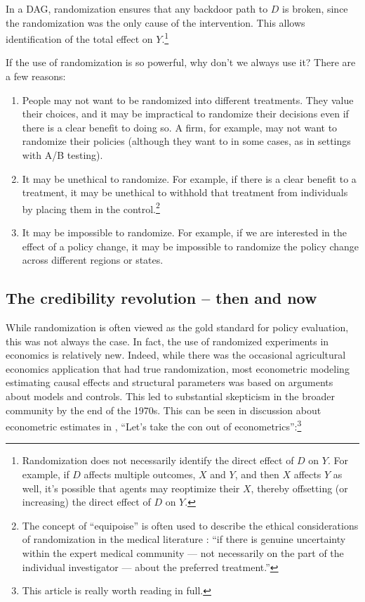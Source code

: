 \documentclass{tufte-handout}
\theoremstyle{break}
\begin{document}
In a DAG, randomization ensures that any backdoor path to $D$ is broken, since the randomization was the only cause of the intervention. This allows identification of the total effect on $Y$.\footnote{Randomization does not necessarily identify the direct effect of $D$ on $Y$. For example, if $D$ affects multiple outcomes, $X$ and $Y$, and then $X$ affects $Y$ as well, it's possible that agents may reoptimize their $X$, thereby offsetting (or increasing) the direct effect of $D$ on $Y$.}

If the use of randomization is so powerful, why don't we always use it? There are a few reasons:

\begin{enumerate}
  \item People may not want to be randomized into different treatments. They value their choices, and it may be impractical to randomize their decisions even if there is a clear benefit to doing so. A firm, for example, may not want to randomize their policies (although they want to in some cases, as in settings with A/B testing).
  \item It may be unethical to randomize. For example, if there is a clear benefit to a treatment, it may be unethical to withhold that treatment from individuals by placing them in the control.\footnote{The concept of ``equipoise'' is often used to describe the ethical considerations of randomization in the medical literature \citep{freedman1987equipoise}: ``if there is
          genuine uncertainty within the expert medical
          community — not necessarily on the part of the
          individual investigator — about the preferred treatment.''}
  \item It may be impossible to randomize. For example, if we are interested in the effect of a policy change, it may be impossible to randomize the policy change across different regions or states.
\end{enumerate}


\subsection{The credibility revolution -- then and now}
While randomization is often viewed as the gold standard for policy evaluation, this was not always the case. In fact, the use of randomized experiments in economics is relatively new. Indeed, while there was the occasional agricultural economics application that had true randomization, most econometric modeling estimating causal effects and structural parameters was based on arguments about models and controls. This led to substantial skepticism in the broader community by the end of the 1970s. This can be seen in discussion about econometric estimates in \citet{leamer1983let}, ``Let's take the con out of econometrics'':\footnote{This \citet{leamer1983let} article is really worth reading in full.}
\end{document}
